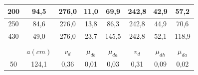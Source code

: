 \documentclass[12pt, a4paper, oneside]{article}
\begin{document}
\begin{table}[h!]
{\begin{tabular}{cccccccc}
\multicolumn{1}{|c|}{200}                             & \multicolumn{1}{c|}{94,5}                           & \multicolumn{1}{c|}{276,0}                      & \multicolumn{1}{c|}{11,0}                        & \multicolumn{1}{c|}{69,9}                        & \multicolumn{1}{c|}{242,8}                      & \multicolumn{1}{c|}{42,9}                        & \multicolumn{1}{c|}{57,2}                        \\ \hline
\multicolumn{1}{|c|}{250}                             & \multicolumn{1}{c|}{84,6}                           & \multicolumn{1}{c|}{276,0}                      & \multicolumn{1}{c|}{13,8}                        & \multicolumn{1}{c|}{86,3}                        & \multicolumn{1}{c|}{242,8}                      & \multicolumn{1}{c|}{44,9}                        & \multicolumn{1}{c|}{70,6}                        \\ \hline
\multicolumn{1}{|c|}{430}                             & \multicolumn{1}{c|}{49,0}                           & \multicolumn{1}{c|}{276,0}                      & \multicolumn{1}{c|}{23,7}                        & \multicolumn{1}{c|}{145,5}                       & \multicolumn{1}{c|}{242,8}                      & \multicolumn{1}{c|}{52,1}                        & \multicolumn{1}{c|}{118,9}                       \\ \hline
                                                      &                                                     &                                                 &                                                  &                                                  &                                                 &                                                  &                                                  \\ \hline
\rowcolor[HTML]{C0C0C0} 
\multicolumn{1}{|c|}{\cellcolor[HTML]{C0C0C0}$c (cm)$}  & \multicolumn{1}{c|}{\cellcolor[HTML]{C0C0C0}$a (cm)$} & \multicolumn{1}{c|}{\cellcolor[HTML]{C0C0C0}$v_d$} & \multicolumn{1}{c|}{\cellcolor[HTML]{C0C0C0}$\mu_{db}$} & \multicolumn{1}{c|}{\cellcolor[HTML]{C0C0C0}$\mu_{da}$} & \multicolumn{1}{c|}{\cellcolor[HTML]{C0C0C0}$v_d$} & \multicolumn{1}{c|}{\cellcolor[HTML]{C0C0C0}$\mu_{dh}$} & \multicolumn{1}{c|}{\cellcolor[HTML]{C0C0C0}$\mu_{da}$} \\ \hline
\multicolumn{1}{|c|}{50}                              & \multicolumn{1}{c|}{124,1}                          & \multicolumn{1}{c|}{0,36}                       & \multicolumn{1}{c|}{0,01}                        & \multicolumn{1}{c|}{0,03}                        & \multicolumn{1}{c|}{0,31}                       & \multicolumn{1}{c|}{0,09}                        & \multicolumn{1}{c|}{0,02}                        \\ \hline

\end{tabular}}
\end{table}
\end{document}
